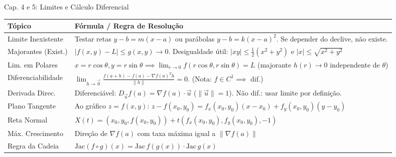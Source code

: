 \documentclass[11pt,a4paper]{article}
\begin{document}
\begin{definitionbox}[breakable, left=4pt, right=4pt, top=4pt, bottom=4pt, boxrule=0.6pt, colframe=primaryColor]{Cap. 4 e 5: Limites e Cálculo Diferencial}
  \def\arraystretch{1.2}
  \begin{tabular}{|p{2.5cm}|p{14.1cm}|}
    \hline
    \textbf{Tópico} & \textbf{Fórmula / Regra de Resolução} \\ \hline
    Limite Inexistente & Testar retas $y-b=m(x-a)$ ou parábolas $y-b=k(x-a)^2$. Se depender do declive, não existe. \\ \hline
    Majorantes (Exist.) & $|f(x,y)-L| \le g(x,y) \to 0$. Desigualdade útil: $|xy| \le \frac{1}{2}(x^2+y^2)$ e $|x| \le \sqrt{x^2+y^2}$ \\ \hline
    Lim. em Polares & $x=r\cos\theta, y=r\sin\theta \implies \lim_{r\to0} f(r\cos\theta,r\sin\theta) = L$ (majorante $h(r) \to 0$ independente de $\theta$) \\ \hline
    Diferenciabilidade & $\lim_{h\to\vec{0}} \frac{f(a+h) - f(a) - \nabla f(a)^T h}{\|h\|} = 0$. (Nota: $f \in C^1 \implies$ dif.) \\ \hline
    Derivada Direc. & Diferenciável: $D_{\vec{u}}f(a) = \nabla f(a) \cdot \vec{u}$ ($\|\vec{u}\|=1$). Não dif.: usar limite por definição. \\ \hline
    Plano Tangente & Ao gráfico $z = f(x,y)$: $z - f(x_0,y_0) = f_x(x_0,y_0)(x-x_0) + f_y(x_0,y_0)(y-y_0)$ \\ \hline
    Reta Normal & $X(t) = (x_0, y_0, f(x_0,y_0)) + t(f_x(x_0,y_0), f_y(x_0,y_0), -1)$ \\ \hline
    Máx. Crescimento & Direção de $\nabla f(a)$ com taxa máxima igual a $\|\nabla f(a)\|$ \\ \hline
    Regra da Cadeia & $\text{Jac}(f \circ g)(x) = \text{Jac}\,f(g(x)) \cdot \text{Jac}\,g(x)$ \\ \hline
  \end{tabular}
\end{definitionbox}
\end{document}
